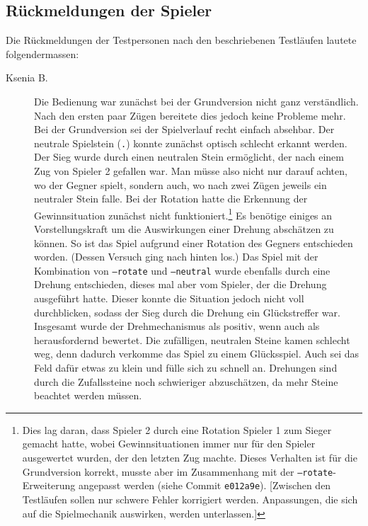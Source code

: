 \documentclass[a4paper,11pt,hidelinks]{scrartcl}
\begin{document}
\subsection{Rückmeldungen der Spieler}

Die Rückmeldungen der Testpersonen nach den beschriebenen Testläufen lautete folgendermassen:

\begin{description}
    \item[Ksenia B.] Die Bedienung war zunächst bei der Grundversion nicht ganz verständlich. Nach den ersten paar Zügen bereitete dies jedoch keine Probleme mehr. Bei der Grundversion sei der Spielverlauf recht einfach absehbar. Der neutrale Spielstein (\texttt{.}) konnte zunächst optisch schlecht erkannt werden. Der Sieg wurde durch einen neutralen Stein ermöglicht, der nach einem Zug von Spieler 2 gefallen war. Man müsse also nicht nur darauf achten, wo der Gegner spielt, sondern auch, wo nach zwei Zügen jeweils ein neutraler Stein falle. Bei der Rotation hatte die Erkennung der Gewinnsituation zunächst nicht funktioniert.\footnote{Dies lag daran, dass Spieler 2 durch eine Rotation Spieler 1 zum Sieger gemacht hatte, wobei Gewinnsituationen immer nur für den Spieler ausgewertet wurden, der den letzten Zug machte. Dieses Verhalten ist für die Grundversion korrekt, musste aber im Zusammenhang mit der \texttt{--rotate}-Erweiterung angepasst werden (siehe Commit \texttt{e012a9e}). [Zwischen den Testläufen sollen nur schwere Fehler korrigiert werden. Anpassungen, die sich auf die Spielmechanik auswirken, werden unterlassen.]} Es benötige einiges an Vorstellungskraft um die Auswirkungen einer Drehung abschätzen zu können. So ist das Spiel aufgrund einer Rotation des Gegners entschieden worden. (Dessen Versuch ging nach hinten los.) Das Spiel mit der Kombination von \texttt{--rotate} und \texttt{--neutral} wurde ebenfalls durch eine Drehung entschieden, dieses mal aber vom Spieler, der die Drehung ausgeführt hatte. Dieser konnte die Situation jedoch nicht voll durchblicken, sodass der Sieg durch die Drehung ein Glückstreffer war. Insgesamt wurde der Drehmechanismus als positiv, wenn auch als herausfordernd bewertet. Die zufälligen, neutralen Steine kamen schlecht weg, denn dadurch verkomme das Spiel zu einem Glücksspiel. Auch sei das Feld dafür etwas zu klein und fülle sich zu schnell an. Drehungen sind durch die Zufallssteine noch schwieriger abzuschätzen, da mehr Steine beachtet werden müssen.

\end{description}
\end{document}
